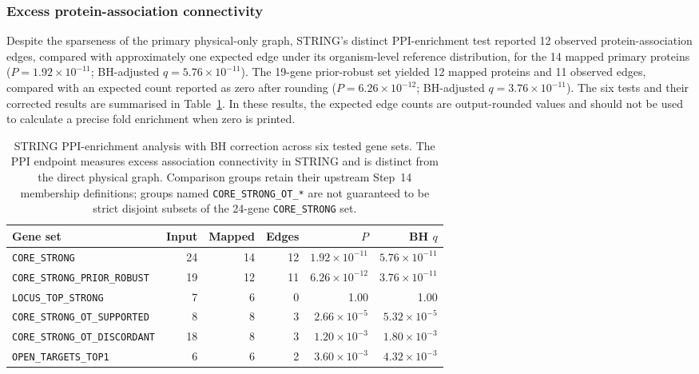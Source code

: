 \documentclass[11pt,a4paper]{article}
\begin{document}
\subsubsection{Excess protein-association connectivity}
Despite the sparseness of the primary physical-only graph, STRING's distinct PPI-enrichment test reported 12 observed protein-association edges, compared with approximately one expected edge under its organism-level reference distribution, for the 14 mapped primary proteins ($P=1.92\times10^{-11}$; BH-adjusted $q=5.76\times10^{-11}$). The 19-gene prior-robust set yielded 12 mapped proteins and 11 observed edges, compared with an expected count reported as zero after rounding ($P=6.26\times10^{-12}$; BH-adjusted $q=3.76\times10^{-11}$). The six tests and their corrected results are summarised in Table~\ref{tab:step15_ppi_enrichment}. In these results, the expected edge counts are output-rounded values and should not be used to calculate a precise fold enrichment when zero is printed.

\begin{table}[!htbp]
\centering\scriptsize
\caption{STRING PPI-enrichment analysis with BH correction across six tested gene sets. The PPI endpoint measures excess association connectivity in STRING and is distinct from the direct physical graph. Comparison groups retain their upstream Step~14 membership definitions; groups named \texttt{CORE\_STRONG\_OT\_*} are not guaranteed to be strict disjoint subsets of the 24-gene \texttt{CORE\_STRONG} set.}
\label{tab:step15_ppi_enrichment}
\begin{tabularx}{\linewidth}{@{}Xrrrrr@{}}
\toprule
Gene set & Input & Mapped & Edges & $P$ & BH $q$ \\\midrule
\texttt{CORE\_STRONG} & 24 & 14 & 12 & $1.92\times10^{-11}$ & $5.76\times10^{-11}$ \\
\texttt{CORE\_STRONG\_PRIOR\_ROBUST} & 19 & 12 & 11 & $6.26\times10^{-12}$ & $3.76\times10^{-11}$ \\
\texttt{LOCUS\_TOP\_STRONG} & 7 & 6 & 0 & 1.00 & 1.00 \\
\texttt{CORE\_STRONG\_OT\_SUPPORTED} & 8 & 8 & 3 & $2.66\times10^{-5}$ & $5.32\times10^{-5}$ \\
\texttt{CORE\_STRONG\_OT\_DISCORDANT} & 18 & 8 & 3 & $1.20\times10^{-3}$ & $1.80\times10^{-3}$ \\
\texttt{OPEN\_TARGETS\_TOP1} & 6 & 6 & 2 & $3.60\times10^{-3}$ & $4.32\times10^{-3}$ \\
\bottomrule
\end{tabularx}
\end{table}
\end{document}
